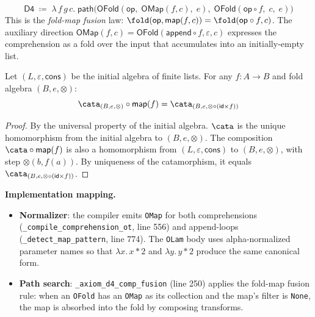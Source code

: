 \begin{definition}
\label{def:d4-path}
\[
  \mathsf{D4} \;\coloneqq\; \lambda\, f\, g\, c.\;
  \mathsf{path}\!\big(
    \mathsf{OFold}(\mathsf{op},\;
      \mathsf{OMap}(f, c),\; e),\;
    \mathsf{OFold}(\mathsf{op} \circ f,\; c,\; e)
  \big)
\]
This is the \emph{fold-map fusion} law:
$\fold(\mathsf{op}, \mathsf{map}(f, c)) = \fold(\mathsf{op} \circ f, c)$.
The auxiliary direction
$\mathsf{OMap}(f, c) = \mathsf{OFold}(\mathsf{append} \circ f,
\varepsilon, c)$ expresses the comprehension as a fold over the
input that accumulates into an initially-empty list.
\end{definition}

\begin{theorem}
\label{thm:d4-sound}
Let $(L, \varepsilon, \mathsf{cons})$ be the initial algebra of
finite lists.  For any $f : A \to B$ and fold algebra
$(B, e, \otimes)$:
\[
  \cata_{(B,e,\otimes)} \circ \mathsf{map}(f)
  = \cata_{(B,e,\otimes \circ (\mathsf{id} \times f))}
\]
\end{theorem}

\begin{proof}
By the universal property of the initial algebra.
$\cata$ is the unique homomorphism from the initial algebra to
$(B, e, \otimes)$.  The composition $\cata \circ \mathsf{map}(f)$
is also a homomorphism from $(L, \varepsilon, \mathsf{cons})$ to
$(B, e, \otimes)$, with step $\otimes(b, f(a))$.
By uniqueness of the catamorphism, it equals
$\cata_{(B, e, \otimes \circ (\mathsf{id} \times f))}$.
\end{proof}

\textbf{Implementation mapping.}
\begin{itemize}
  \item \textbf{Normalizer}: the compiler emits \texttt{OMap} for
    both comprehensions (\texttt{\_compile\_comprehension\_ot},
    line 556) and append-loops (\texttt{\_detect\_map\_pattern},
    line 774).  The \texttt{OLam} body uses alpha-normalized
    parameter names so that $\lambda x.\,x*2$ and
    $\lambda y.\,y*2$ produce the same canonical form.
  \item \textbf{Path search}: \texttt{\_axiom\_d4\_comp\_fusion}
    (line 250) applies the fold-map fusion rule:
    when an \texttt{OFold} has an \texttt{OMap} as its collection
    and the map's filter is \texttt{None}, the map is absorbed into
    the fold by composing transforms.
\end{itemize}

